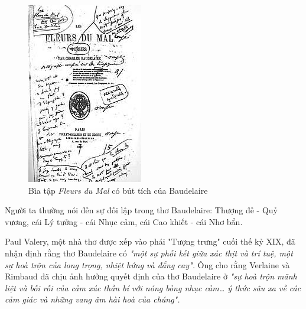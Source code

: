 \documentclass[../main.tex]{subfiles}
\begin{document}
\begin{multicols}{2}
 \begin{figure}
	\centering
	\includegraphics[width=\textwidth]{../img/tho080708_2.jpg}
	\caption{Bìa tập \textit{Fleurs du Mal} có bút tích của Baudelaire}
\end{figure}
 Người ta thường nói đến sự đối lập trong thơ Baudelaire: Thượng đế - Quỷ vương, cái Lý tưởng - cái Nhục cảm, cái Cao khiết - cái Nhơ bẩn. 
 
Paul Valery, một nhà thơ được xếp vào phái "Tượng trưng" cuối thế kỷ XIX, đã nhận định rằng thơ Baudelaire có \textit{"một sự phối kết giữa xác thịt và trí tuệ, một sự hoà trộn của long trọng, nhiệt hứng và đắng cay". }Ông cho rằng Verlaine và Rimbaud đã chịu ảnh hưởng quyết định của thơ Baudelaire ở \textit{"sự hoà trộn mãnh liệt và bối rối của cảm xúc thần bí với nóng bỏng nhục cảm… ý thức sâu xa về các cảm giác và những vang âm hài hoà của chúng".} 
 

\end{multicols}
\end{document}
